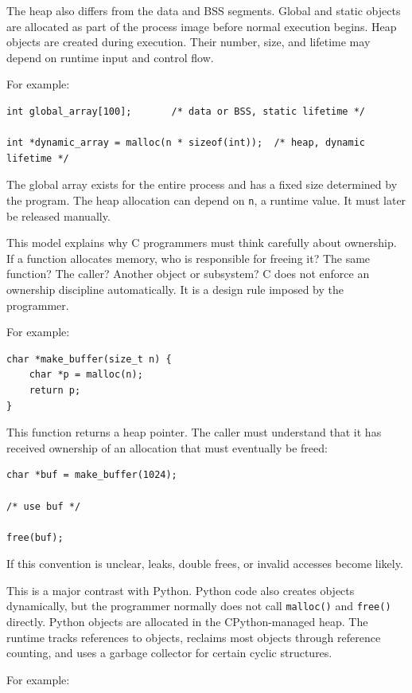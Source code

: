 The heap also differs from the data and BSS segments. Global and static objects are allocated as part of the process image before normal execution begins. Heap objects are created during execution. Their number, size, and lifetime may depend on runtime input and control flow.

For example:

\begin{verbatim}
int global_array[100];       /* data or BSS, static lifetime */

int *dynamic_array = malloc(n * sizeof(int));  /* heap, dynamic lifetime */
\end{verbatim}

The global array exists for the entire process and has a fixed size determined by the program. The heap allocation can depend on \texttt{n}, a runtime value. It must later be released manually.

This model explains why C programmers must think carefully about ownership. If a function allocates memory, who is responsible for freeing it? The same function? The caller? Another object or subsystem? C does not enforce an ownership discipline automatically. It is a design rule imposed by the programmer.

For example:

\begin{verbatim}
char *make_buffer(size_t n) {
    char *p = malloc(n);
    return p;
}
\end{verbatim}

This function returns a heap pointer. The caller must understand that it has received ownership of an allocation that must eventually be freed:

\begin{verbatim}
char *buf = make_buffer(1024);

/* use buf */

free(buf);
\end{verbatim}

If this convention is unclear, leaks, double frees, or invalid accesses become likely.

This is a major contrast with Python. Python code also creates objects dynamically, but the programmer normally does not call \texttt{malloc()} and \texttt{free()} directly. Python objects are allocated in the CPython-managed heap. The runtime tracks references to objects, reclaims most objects through reference counting, and uses a garbage collector for certain cyclic structures.

For example:

